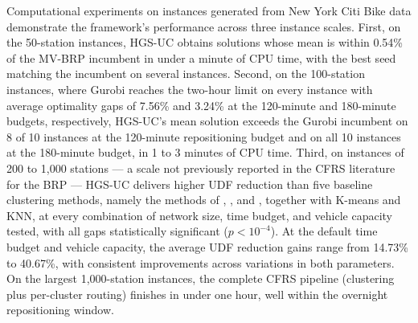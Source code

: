 Computational experiments on instances generated from New York Citi Bike data demonstrate the framework's performance across three instance scales. First, on the 50-station instances, HGS-UC obtains solutions whose mean is within 0.54\% of the MV-BRP incumbent in under a minute of CPU time, with the best seed matching the incumbent on several instances. Second, on the 100-station instances, where Gurobi reaches the two-hour limit on every instance with average optimality gaps of 7.56\% and 3.24\% at the 120-minute and 180-minute budgets, respectively,  HGS-UC's mean solution exceeds the Gurobi incumbent on 8 of 10 instances at the 120-minute repositioning budget and on all 10 instances at the 180-minute budget, in 1 to 3 minutes of CPU time. Third, on instances of 200 to 1,000 stations --- a scale not previously reported in the CFRS literature for the BRP --- HGS-UC delivers higher UDF reduction than five baseline clustering methods, namely the methods of \citet{schuijbroekInventoryRebalancingVehicle2017}, \citet{forma3stepMathHeuristic2015}, and \citet{lvHybridAlgorithmStatic2020}, together with K-means and KNN, at every combination of network size, time budget, and vehicle capacity tested, with all gaps statistically significant ($p<10^{-4}$). At the default time budget and vehicle capacity, the average UDF reduction gains range from 14.73\% to 40.67\%, with consistent improvements across variations in both parameters. On the largest 1,000-station instances, the complete CFRS pipeline (clustering plus per-cluster routing) finishes in under one hour, well within the overnight repositioning window.

